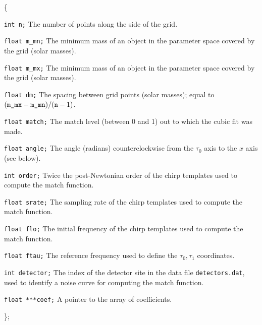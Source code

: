 \{
\begin{description}
\item{\tt int n;}
  The number of points along the side of the grid.

\item{\tt float m\_mn;}
  The minimum mass of an object in the parameter space covered by the
  grid (solar masses).

\item{\tt float m\_mx;}
  The minimum mass of an object in the parameter space covered by the
  grid (solar masses).

\item{\tt float dm;}
  The spacing between grid points (solar masses); equal to $(\hbox{\tt
  m\_mx}-\hbox{\tt m\_mn})/(\hbox{\tt n}-1)$.

\item{\tt float match;}
  The match level (between 0 and 1) out to which the cubic fit was
  made.

\item{\tt float angle;}
  The angle (radians) counterclockwise from the $\tau_0$ axis to the
  $x$ axis (see below).

\item{\tt int order;}
  Twice the post-Newtonian order of the chirp templates used to
  compute the match function.

\item{\tt float srate;}
  The sampling rate of the chirp templates used to compute the match
  function.

\item{\tt float flo;}
  The initial frequency of the chirp templates used to compute the
  match function.

\item{\tt float ftau;}
  The reference frequency used to define the $\tau_0,\tau_1$
  coordinates.

\item{\tt int detector;}
  The index of the detector site in the data file {\tt detectors.dat},
  used to identify a noise curve for computing the match function.

\item{\tt float ***coef;}
  A pointer to the array of coefficients.

\end{description}
\};

